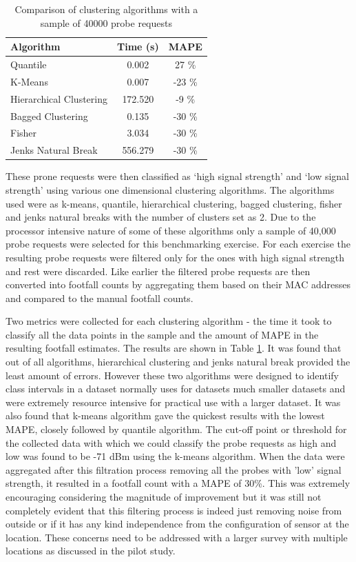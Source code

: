 \begin{table}
  \footnotesize
  \caption{Comparison of clustering algorithms with a sample of 40000 probe requests}
  \centering
  \begin{tabular}{lcc} 
    \toprule
     Algorithm				      	& Time (s)& MAPE\\
    \midrule
     Quantile				        	& 0.002 	&  27 \% \\
     K-Means			 	        	& 0.007 	& -23 \% \\
     Hierarchical Clustering	& 172.520	&  -9 \% \\
     Bagged Clustering 		  	& 0.135 	& -30 \% \\
     Fisher 				        	& 3.034 	& -30 \% \\
     Jenks Natural Break 	   	& 556.279	& -30 \% \\
     \bottomrule
  \end{tabular}
  \label{table:processing:oxst:classification}
\end{table}

These prone requests were then classified as `high signal strength' and `low signal strength' using various one dimensional clustering algorithms.
The algorithms used were as k-means, quantile, hierarchical clustering, bagged clustering, fisher and jenks natural breaks with the number of clusters set as 2.
Due to the processor intensive nature of some of these algorithms only a sample of 40,000 probe requests were selected for this benchmarking exercise.
For each exercise the resulting probe requests were filtered only for the ones with high signal strength and rest were discarded.
Like earlier the filtered probe requests are then converted into footfall counts by aggregating them based on their MAC addresses and compared to the manual footfall counts.

Two metrics were collected for each clustering algorithm - the time it took to classify all the data points in the sample and the amount of MAPE in the resulting footfall estimates.
The results are shown in Table \ref{table:processing:oxst:classification}.
It was found that out of all algorithms,  hierarchical clustering and jenks natural break provided the least amount of errors.
However these two algorithms were designed to identify class intervals in a dataset normally uses for datasets much smaller datasets and were extremely resource intensive for practical use with a larger dataset.
It was also found that k-means algorithm gave the quickest results with the lowest MAPE, closely followed by quantile algorithm.
The cut-off point or threshold for the collected data with which we could classify the probe requests as high and low was found to be -71 dBm using the k-means algorithm.
When the data were aggregated after this filtration process removing all the probes with 'low' signal strength, it resulted in a footfall count with a MAPE of 30\%.
This was extremely encouraging considering the magnitude of improvement but it was still not completely evident that this filtering process is indeed just removing noise from outside or if it has any kind independence from the configuration of sensor at the location.
These concerns need to be addressed with a larger survey with multiple locations as discussed in the pilot study.

